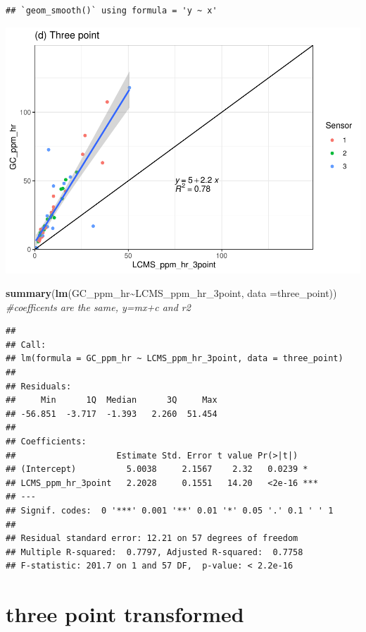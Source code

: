 \documentclass[
]{article}
\newenvironment{Shaded}{\begin{snugshade}}{\end{snugshade}}
\newcommand{\AttributeTok}[1]{\textcolor[rgb]{0.13,0.29,0.53}{#1}}
\newcommand{\CommentTok}[1]{\textcolor[rgb]{0.56,0.35,0.01}{\textit{#1}}}
\newcommand{\FunctionTok}[1]{\textcolor[rgb]{0.13,0.29,0.53}{\textbf{#1}}}
\newcommand{\NormalTok}[1]{#1}
\newcommand{\SpecialCharTok}[1]{\textcolor[rgb]{0.81,0.36,0.00}{\textbf{#1}}}
\begin{document}
\begin{verbatim}
## `geom_smooth()` using formula = 'y ~ x'
\end{verbatim}

\includegraphics{Initial_look_GC_LCMS_files/figure-latex/unnamed-chunk-7-1.pdf}

\begin{Shaded}
\begin{Highlighting}[]
\FunctionTok{summary}\NormalTok{(}\FunctionTok{lm}\NormalTok{(GC\_ppm\_hr}\SpecialCharTok{\textasciitilde{}}\NormalTok{LCMS\_ppm\_hr\_3point, }\AttributeTok{data =}\NormalTok{three\_point)) }\CommentTok{\#coefficents are the same, y=mx+c and r2}
\end{Highlighting}
\end{Shaded}

\begin{verbatim}
## 
## Call:
## lm(formula = GC_ppm_hr ~ LCMS_ppm_hr_3point, data = three_point)
## 
## Residuals:
##     Min      1Q  Median      3Q     Max 
## -56.851  -3.717  -1.393   2.260  51.454 
## 
## Coefficients:
##                    Estimate Std. Error t value Pr(>|t|)    
## (Intercept)          5.0038     2.1567    2.32   0.0239 *  
## LCMS_ppm_hr_3point   2.2028     0.1551   14.20   <2e-16 ***
## ---
## Signif. codes:  0 '***' 0.001 '**' 0.01 '*' 0.05 '.' 0.1 ' ' 1
## 
## Residual standard error: 12.21 on 57 degrees of freedom
## Multiple R-squared:  0.7797, Adjusted R-squared:  0.7758 
## F-statistic: 201.7 on 1 and 57 DF,  p-value: < 2.2e-16
\end{verbatim}

\section{three point transformed}\label{three-point-transformed}
\end{document}
